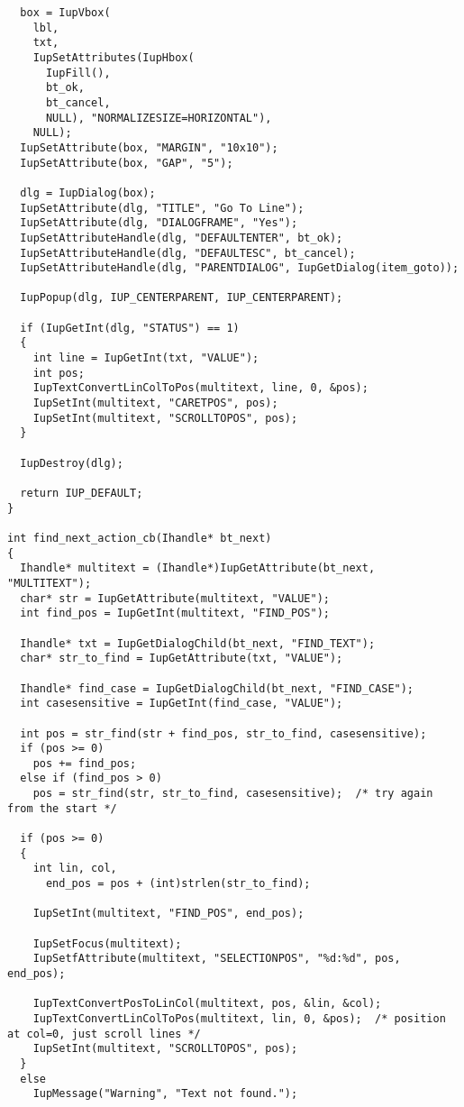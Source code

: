 \documentclass{ctexart}
\begin{document}
\begin{lstlisting}
  box = IupVbox(
    lbl,
    txt,
    IupSetAttributes(IupHbox(
      IupFill(),
      bt_ok,
      bt_cancel,
      NULL), "NORMALIZESIZE=HORIZONTAL"),
    NULL);
  IupSetAttribute(box, "MARGIN", "10x10");
  IupSetAttribute(box, "GAP", "5");

  dlg = IupDialog(box);
  IupSetAttribute(dlg, "TITLE", "Go To Line");
  IupSetAttribute(dlg, "DIALOGFRAME", "Yes");
  IupSetAttributeHandle(dlg, "DEFAULTENTER", bt_ok);
  IupSetAttributeHandle(dlg, "DEFAULTESC", bt_cancel);
  IupSetAttributeHandle(dlg, "PARENTDIALOG", IupGetDialog(item_goto));

  IupPopup(dlg, IUP_CENTERPARENT, IUP_CENTERPARENT);

  if (IupGetInt(dlg, "STATUS") == 1)
  {
    int line = IupGetInt(txt, "VALUE");
    int pos;
    IupTextConvertLinColToPos(multitext, line, 0, &pos);
    IupSetInt(multitext, "CARETPOS", pos);
    IupSetInt(multitext, "SCROLLTOPOS", pos);
  }

  IupDestroy(dlg);

  return IUP_DEFAULT;
}

int find_next_action_cb(Ihandle* bt_next)
{
  Ihandle* multitext = (Ihandle*)IupGetAttribute(bt_next, "MULTITEXT");
  char* str = IupGetAttribute(multitext, "VALUE");
  int find_pos = IupGetInt(multitext, "FIND_POS");

  Ihandle* txt = IupGetDialogChild(bt_next, "FIND_TEXT");
  char* str_to_find = IupGetAttribute(txt, "VALUE");

  Ihandle* find_case = IupGetDialogChild(bt_next, "FIND_CASE");
  int casesensitive = IupGetInt(find_case, "VALUE");

  int pos = str_find(str + find_pos, str_to_find, casesensitive);
  if (pos >= 0)
    pos += find_pos;
  else if (find_pos > 0)
    pos = str_find(str, str_to_find, casesensitive);  /* try again from the start */

  if (pos >= 0)
  {
    int lin, col, 
      end_pos = pos + (int)strlen(str_to_find);

    IupSetInt(multitext, "FIND_POS", end_pos);

    IupSetFocus(multitext);
    IupSetfAttribute(multitext, "SELECTIONPOS", "%d:%d", pos, end_pos);

    IupTextConvertPosToLinCol(multitext, pos, &lin, &col);
    IupTextConvertLinColToPos(multitext, lin, 0, &pos);  /* position at col=0, just scroll lines */
    IupSetInt(multitext, "SCROLLTOPOS", pos);
  }
  else
    IupMessage("Warning", "Text not found.");


\end{lstlisting}
\end{document}

